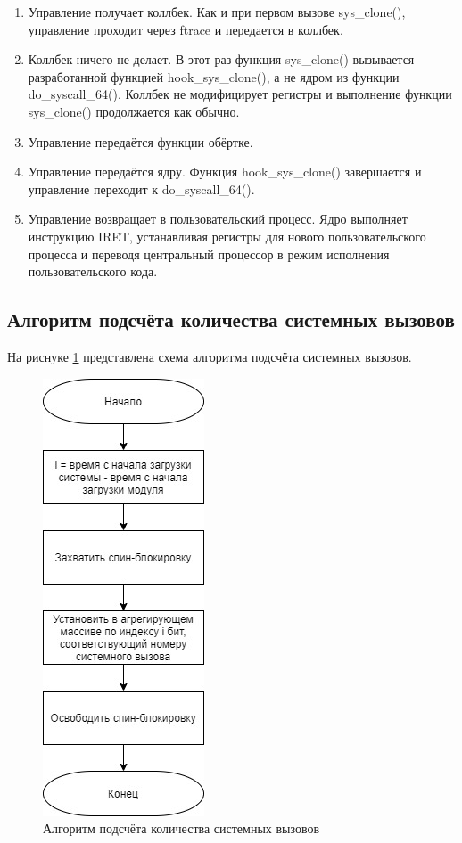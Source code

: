 \begin{enumerate}
	\item Управление получает коллбек. Как и при первом вызове sys\_clone(), управление проходит через ftrace и передается в коллбек.
	
	\item Коллбек ничего не делает. В этот раз функция sys\_clone() вызывается разработанной функцией hook\_sys\_clone(), а не ядром из функции\\ do\_syscall\_64(). Коллбек не модифицирует регистры и выполнение функции sys\_clone() продолжается как обычно.
	
	\item Управление передаётся функции обёртке.
	
	\item Управление передаётся ядру. Функция hook\_sys\_clone() завершается и управление переходит к do\_syscall\_64().
	
	\item Управление возвращает в пользовательский процесс. Ядро выполняет инструкцию IRET, устанавливая регистры для нового пользовательского процесса и переводя центральный процессор в режим исполнения пользовательского кода.
\end{enumerate}

\subsection{Алгоритм подсчёта количества системных вызовов}

На риснуке \ref{fig:ftrace_cnt_algo} представлена схема алгоритма подсчёта системных вызовов.

\begin{figure}[h]
	\begin{center}
		\includegraphics[scale=0.6]{jpg/syscalls_count.jpg}
	\end{center}
	\caption{Алгоритм подсчёта количества системных вызовов}
	\label{fig:ftrace_cnt_algo}
\end{figure}

